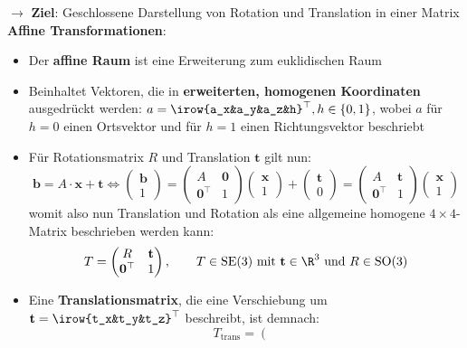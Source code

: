 $\rightarrow$ \textbf{Ziel}: Geschlossene Darstellung von Rotation und Translation in einer Matrix\\

\textbf{Affine Transformationen}:
\begin{itemize}
	\item Der \textbf{affine Raum} ist eine Erweiterung zum euklidischen Raum
	\item Beinhaltet Vektoren, die in \textbf{erweiterten, homogenen Koordinaten} ausgedrückt werden: $a=\irow{a_x&a_y&a_z&h}^\top, h\in\{0,1\}$, wobei $a$ für $h=0$ einen Ortsvektor und für $h=1$ einen Richtungsvektor beschriebt
	\item Für Rotationsmatrix $R$ und Translation $\mathbf{t}$ gilt nun: 
	$$\mathbf{b}=A\cdot\mathbf{x}+\mathbf{t}
	\Leftrightarrow 
	\left(\begin{matrix}
		\mathbf{b} \\
		1
	\end{matrix}\right)=
	\left(\begin{matrix}
		A & \mathbf{0} \\
		\mathbf{0}^\top & 1
	\end{matrix}\right)
	\left(\begin{matrix}
		\mathbf{x} \\
		1
	\end{matrix}\right)+
	\left(\begin{matrix}
		\mathbf{t} \\
		0
	\end{matrix}\right)=
	\left(\begin{matrix}
		A & \mathbf{t} \\
		\mathbf{0}^\top & 1
	\end{matrix}\right)
	\left(\begin{matrix}
		\mathbf{x} \\
		1
	\end{matrix}\right)
	$$
	womit also nun Translation und Rotation als eine allgemeine homogene $4\times4$-Matrix beschrieben werden kann:
	$$T=
	\left(\begin{matrix}
		R & \mathbf{t} \\
		\mathbf{0}^\top & 1
	\end{matrix}\right), \qquad T\in\text{SE(3)}\text{ mit } \mathbf{t}\in\R^3\text{ und }R\in\text{SO(3)}$$
	\item Eine \textbf{Translationsmatrix}, die eine Verschiebung um $\mathbf{t}=\irow{t_x&t_y&t_z}^\top$ beschreibt, ist demnach:
	$$T_\text{trans}=\left(\begin{matrix}

\end{matrix}$$
\end{itemize}
